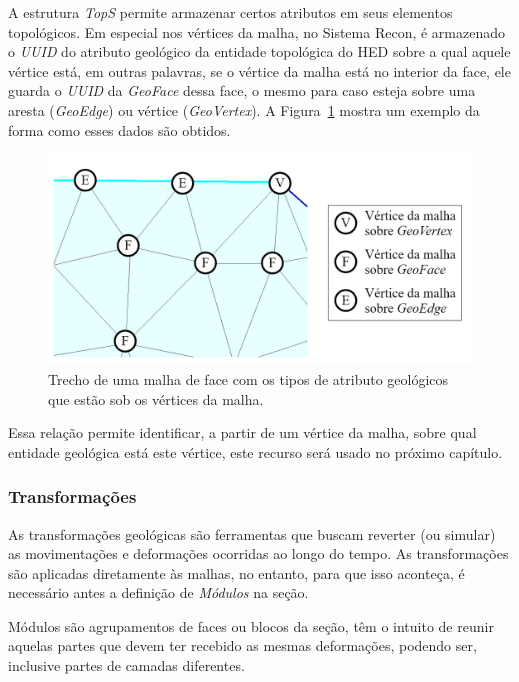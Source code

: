 A estrutura \textit{TopS} permite armazenar certos atributos em seus elementos topológicos. Em especial nos vértices da malha, no Sistema Recon, é armazenado o \textit{UUID} do atributo geológico da entidade topológica do HED sobre a qual aquele vértice está, em outras palavras, se o vértice da malha está no interior da face, ele guarda o \textit{UUID} da \textit{GeoFace} dessa face, o mesmo para caso esteja sobre uma aresta (\textit{GeoEdge}) ou vértice (\textit{GeoVertex}). A Figura~\ref{fig-recon-4} mostra um exemplo da forma como esses dados são obtidos.

\begin{figure} [H]
  \begin{center}
    \includegraphics[width=\textwidth]{images/fig-recon-4}
    \caption{Trecho de uma malha de face com os tipos de atributo geológicos que estão sob os vértices da malha.}\label{fig-recon-4}
  \end{center}
\end{figure}

Essa relação permite identificar, a partir de um vértice da malha, sobre qual entidade geológica está este vértice, este recurso será usado no próximo capítulo.

\subsubsection{Transformações}

As transformações geológicas são ferramentas que buscam reverter (ou simular) as movimentações e deformações ocorridas ao longo do tempo.\cite{Santi} As transformações são aplicadas diretamente às malhas, no entanto, para que isso aconteça, é necessário antes a definição de \textit{Módulos} na seção. 

Módulos são agrupamentos de faces ou blocos da seção, têm o intuito de reunir aquelas partes que devem ter recebido as mesmas deformações, podendo ser, inclusive partes de camadas diferentes.

